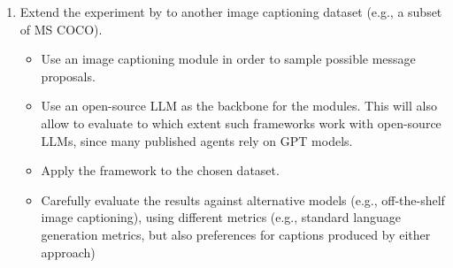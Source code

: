 \documentclass[fleqn,reqno,10pt]{article}
\begin{document}
\begin{enumerate}
  \item Extend the experiment by \citet{tsvilodub2024cognitivemodelingscaffoldedllms} to another image captioning dataset (e.g., a subset of MS COCO).  %
  \begin{itemize}
  	\item Use an image captioning module in order to sample possible message proposals.
  	\item Use an open-source LLM as the backbone for the modules. This will also allow to evaluate to which extent such frameworks work with open-source LLMs, since many published agents rely on GPT models.
  	\item Apply the framework to the chosen dataset.
  	\item Carefully evaluate the results against alternative models (e.g., off-the-shelf image captioning), using different metrics (e.g., standard language generation metrics, but also preferences for captions produced by either approach)
  \end{itemize}

\end{enumerate}
\end{document}
